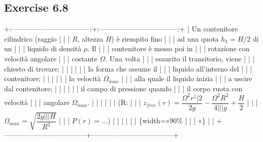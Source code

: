 \documentclass[letterpaper,10pt,italian]{jupyterBook}
\begin{document}
\subsection{Exercise 6.8}
\label{\detokenize{polimi/fluidmechanics-ita/template/capitoli/06_slnEsatte/0608in:exercise-6-8}}\label{\detokenize{polimi/fluidmechanics-ita/template/capitoli/06_slnEsatte/0608in:fluid-mechanics-exact-solutions-ex08}}\label{\detokenize{polimi/fluidmechanics-ita/template/capitoli/06_slnEsatte/0608in::doc}}
\sphinxAtStartPar
+:———————————:+:———————————:+
| Un contenitore cilindrico (raggio |                                   |
| \(R\), altezza \(H\)) è riempito fino |                                   |
| ad una quota \(h_1 =H/2\) di un     |                                   |
| liquido di densità \(\rho\). Il     |                                   |
| contenitore è messo poi in        |                                   |
| rotazione con velocità angolare   |                                   |
| costante \(\Omega\). Una volta      |                                   |
| esaurito il transitorio, viene    |                                   |
| chiesto di trovare:               |                                   |
|                                   |                                   |
| \sphinxhyphen{}   la forma che assume il        |                                   |
|     liquido all’interno del       |                                   |
|     contenitore;                  |                                   |
|                                   |                                   |
| \sphinxhyphen{}   la velocità \(\Omega_{max}\)    |                                   |
|     alla quale il liquido inizia  |                                   |
|     a uscire dal contenitore;     |                                   |
|                                   |                                   |
| \sphinxhyphen{}   il campo di pressione quando  |                                   |
|     il corpo ruota con velocità   |                                   |
|     angolare \(\Omega_{max}\).      |                                   |
|                                   |                                   |
| (R:                               |                                   |
| \(z_{free}(r) = \dfrac{\Omega^2 r^ |                                   |
| 2}{2 g} - \dfrac{\Omega^2 R^2}{4  |                                   |
| g} + \dfrac{H}{2}\)                |                                   |
| \(\Omega_{max} = \sqrt{\dfrac{2 g  |                                   |
| H}{R^2}}\)                         |                                   |
| \(P(r) = \dots\))                   |                                   |
|                                   |                                   |
| \{width=»90\% |                                   |
| «\}                                |                                   |
+———————————–+———————————–+
\end{document}
